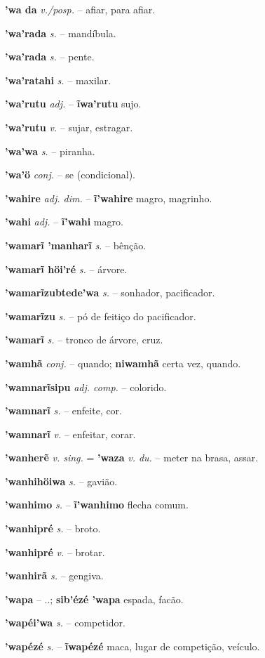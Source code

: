 \textbf{'wa da} \textit{v./posp.} -- afiar, para afiar.

\textbf{'wa'rada} \textit{s.} -- mandíbula.

\textbf{'wa'rada} \textit{s.} -- pente.

\textbf{'wa'ratahi} \textit{s.} -- maxilar.

\textbf{'wa'rutu} \textit{adj.} -- \textbf{ĩwa'rutu} sujo.

\textbf{'wa'rutu} \textit{v.} -- sujar, estragar.

\textbf{'wa'wa} \textit{s.} -- piranha.

\textbf{'wa'ö} \textit{conj.} -- se (condicional).

\textbf{'wahire} \textit{adj. dim.} -- \textbf{ĩ'wahire} magro, magrinho.

\textbf{'wahi} \textit{adj.} -- \textbf{ĩ'wahi} magro.

\textbf{'wamarĩ 'manharĩ} \textit{s.} -- bênção.

\textbf{'wamarĩ höi'ré} \textit{s.} -- árvore.

\textbf{'wamarĩzubtede'wa} \textit{s.} -- sonhador, pacificador.

\textbf{'wamarĩzu} \textit{s.} -- pó de feitiço do pacificador.

\textbf{'wamarĩ} \textit{s.} -- tronco de árvore, cruz.

\textbf{'wamhã} \textit{conj.} -- quando; \textbf{niwamhã} certa vez, quando.

\textbf{'wamnarĩsipu} \textit{adj. comp.} -- colorido.

\textbf{'wamnarĩ} \textit{s.} -- enfeite, cor.

\textbf{'wamnarĩ} \textit{v.} -- enfeitar, corar.

\textbf{'wanherẽ} \textit{v. sing.} = \textbf{'waza} \textit{v. du.} -- meter na brasa, assar.

\textbf{'wanhihöiwa} \textit{s.} -- gavião.

\textbf{'wanhimo} \textit{s.} -- \textbf{ĩ'wanhimo} flecha comum.

\textbf{'wanhipré} \textit{s.} -- broto.

\textbf{'wanhipré} \textit{v.} -- brotar.

\textbf{'wanhirã} \textit{s.} -- gengiva.

\textbf{'wapa} \textit{} -- ..; \textbf{sib'ézé 'wapa} espada, facão.

\textbf{'wapéi'wa} \textit{s.} -- competidor.

\textbf{'wapézé} \textit{s.} -- \textbf{ĩwapézé} maca, lugar de competição, veículo.

